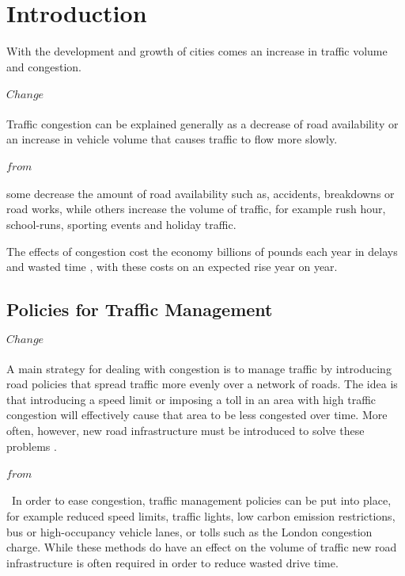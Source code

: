 \section{Introduction}
With the development and growth of cities comes an increase in traffic volume and congestion. 
\\\\
$Change$
\\\\
Traffic congestion can be explained generally as a decrease of road availability or an increase in vehicle volume that causes traffic to flow more slowly.
\\\\
$from$
\\\\
some decrease the amount of road availability such as, accidents, breakdowns or road works, while others increase the volume of traffic, for example rush hour, school-runs, sporting events and holiday traffic. 

The effects of congestion cost the economy billions of pounds each year in delays and wasted time \cite{arnott1994economics,FinancialTimes}, with these costs on an expected rise year on year. 
\subsection*{Policies for Traffic Management}
$Change$
\\\\
A main strategy for dealing with congestion is to manage traffic by introducing road policies that spread traffic more evenly over a network of roads. The idea is that introducing a speed limit or imposing a toll in an area with high traffic congestion will effectively cause that area to be less congested over time. More often, however, new road infrastructure must be introduced to solve these problems \cite{TFLImpacts}.
\\\\
$from$
\\\\\
In order to ease congestion, traffic management policies can be put into place, for example reduced speed limits, traffic lights, low carbon emission restrictions, bus or high-occupancy vehicle lanes, or tolls such as the London congestion charge. While these methods do have an effect on the volume of traffic \cite{TFLImpacts} new road infrastructure is often required in order to reduce wasted drive time.
